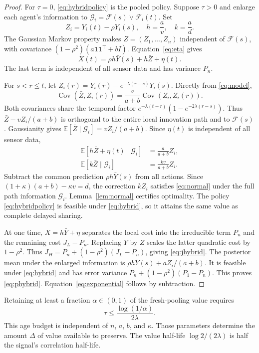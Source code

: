 \documentclass[letterpaper,10pt,conference]{ieeeconf}
\newcommand{\E}{\mathbb E}
\newcommand{\Cov}{\operatorname{Cov}}
\begin{document}
\begin{proof}
For $\tau=0$, \eqref{eq:hybridpolicy} is the pooled policy. Suppose $\tau>0$ and enlarge each agent's information to $\mathcal G_i=\mathcal F(s)\vee\mathcal F_i(t)$. Set
\begin{equation}
 Z_i=Y_i(t)-\rho Y_i(s),\quad h=\frac av,\quad k=\frac ad.\label{eq:innov}
\end{equation}
The Gaussian Markov property makes $Z=(Z_1,\ldots,Z_n)$ independent of $\mathcal F(s)$, with covariance $(1-\rho^2)(a\mathbf1\mathbf1^\top+bI)$. Equation~\eqref{eq:eta} gives
\begin{equation}
 X(t)=\rho h\bar Y(s)+h\bar Z+\eta(t).\label{eq:targetdecomp}
\end{equation}
The last term is independent of all sensor data and has variance $P_n$.

For $s<r\le t$, let $Z_i(r)=Y_i(r)-e^{-\lambda(r-s)}Y_i(s)$. Directly from \eqref{eq:model},
\begin{equation}
 \Cov(\bar Z,Z_i(r))=\frac{v}{a+b}\Cov(Z_i,Z_i(r)).\label{eq:pathcov}
\end{equation}
Both covariances share the temporal factor $e^{-\lambda(t-r)}(1-e^{-2\lambda(r-s)})$. Thus $\bar Z-vZ_i/(a+b)$ is orthogonal to the entire local innovation path and to $\mathcal F(s)$. Gaussianity gives $\E[\bar Z\mid\mathcal G_i]=vZ_i/(a+b)$. Since $\eta(t)$ is independent of all sensor data,
\begin{align*}
 \E[h\bar Z+\eta(t)\mid\mathcal G_i]&=\frac{a}{a+b}Z_i,\\
 \E[k\bar Z\mid\mathcal G_i]&=\frac{kv}{a+b}Z_i.
\end{align*}
Subtract the common prediction $\rho h\bar Y(s)$ from all actions. Since $(1+\kappa)(a+b)-\kappa v=d$, the correction $kZ_i$ satisfies \eqref{eq:normal} under the full path information $\mathcal G_i$. Lemma~\ref{lem:normal} certifies optimality. The policy \eqref{eq:hybridpolicy} is feasible under \eqref{eq:hybrid}, so it attains the same value as complete delayed sharing.

At one time, $X=h\bar Y+\eta$ separates the local cost into the irreducible term $P_n$ and the remaining cost $J_L-P_n$. Replacing $Y$ by $Z$ scales the latter quadratic cost by $1-\rho^2$. Thus $J_H=P_n+(1-\rho^2)(J_L-P_n)$, giving \eqref{eq:jhybrid}. The posterior mean under the enlarged information is $\rho h\bar Y(s)+aZ_i/(a+b)$. It is feasible under \eqref{eq:hybrid} and has error variance $P_n+(1-\rho^2)(P_1-P_n)$. This proves \eqref{eq:phybrid}. Equation~\eqref{eq:exponential} follows by subtraction.
\end{proof}
Retaining at least a fraction $\alpha\in(0,1)$ of the fresh-pooling value requires
\begin{equation}
 \tau\le\frac{\log(1/\alpha)}{2\lambda}.\label{eq:agebudget}
\end{equation}
This age budget is independent of $n$, $a$, $b$, and $\kappa$. Those parameters determine the amount $\Delta$ of value available to preserve. The value half-life $\log 2/(2\lambda)$ is half the signal's correlation half-life.
\end{document}
